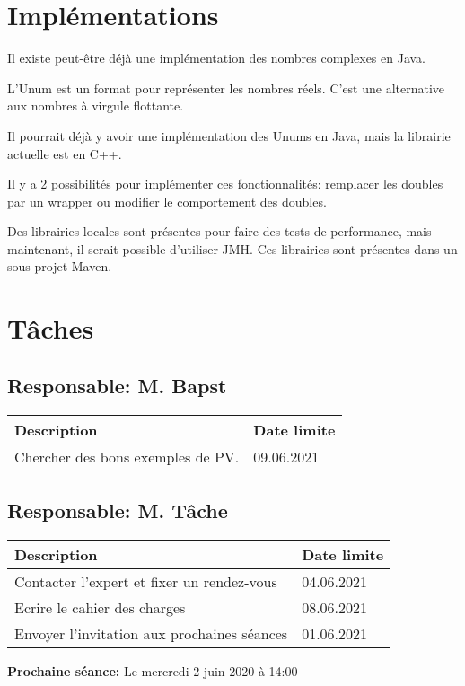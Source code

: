 \documentclass[11pt]{meetingmins}
\begin{document}
\section{Implémentations}
\begin{hiddenitems}
    \item Il existe peut-être déjà une implémentation des nombres complexes en Java.
    \item L'Unum est un format pour représenter les nombres réels. C'est une alternative aux nombres à virgule flottante.
    \item Il pourrait déjà y avoir une implémentation des Unums en Java, mais la librairie actuelle est en C++.
    \item Il y a 2 possibilités pour implémenter ces fonctionnalités: remplacer les doubles par un wrapper ou modifier le comportement des doubles.
    \item Des librairies locales sont présentes pour faire des tests de performance, mais maintenant, il serait possible d'utiliser JMH. Ces librairies sont présentes dans un sous-projet Maven.
\end{hiddenitems}

\section{Tâches}
\subsection{Responsable: M. Bapst}

\begin{table}[ht]
    \begin{tabularx}{\columnwidth}{ | X | p{8em} |}
        \hline
        \textbf{Description} & \textbf{Date limite} \\
        \hline
        Chercher des bons exemples de PV. & 09.06.2021 \\
        \hline
    \end{tabularx}
\end{table}

\subsection{Responsable: M. Tâche}

\begin{table}[ht]
    \begin{tabularx}{\columnwidth}{ | X | p{8em} |}
        \hline
        \textbf{Description} & \textbf{Date limite} \\
        \hline
        Contacter l'expert et fixer un rendez-vous & 04.06.2021 \\
        Ecrire le cahier des charges & 08.06.2021 \\
        Envoyer l'invitation aux prochaines séances & 01.06.2021 \\
        \hline
    \end{tabularx}
\end{table}

\vspace{1em}
\par \noindent \textbf {Prochaine séance:} Le mercredi 2 juin 2020 à 14:00
\end{document}
